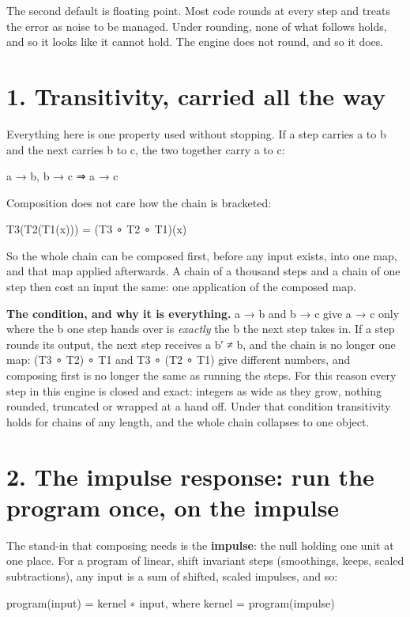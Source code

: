 The second default is floating point. Most code rounds at every step and treats the error as noise to be managed. Under rounding, none of what follows holds, and so it looks like it cannot hold. The engine does not round, and so it does.

\section{\texorpdfstring{1. Transitivity, carried all the way}{1. Transitivity, carried all the way}}

Everything here is one property used without stopping. If a step carries a to b and the next carries b to c, the two together carry a to c:

a → b,  b → c   ⇒   a → c

Composition does not care how the chain is bracketed:

T3(T2(T1(x))) = (T3 ∘ T2 ∘ T1)(x)

So the whole chain can be composed first, before any input exists, into one map, and that map applied afterwards. A chain of a thousand steps and a chain of one step then cost an input the same: one application of the composed map.

\textbf{The condition, and why it is everything.} a → b and b → c give a → c only where the b one step hands over is \emph{exactly} the b the next step takes in. If a step rounds its output, the next step receives a b′ ≠ b, and the chain is no longer one map: (T3 ∘ T2) ∘ T1 and T3 ∘ (T2 ∘ T1) give different numbers, and composing first is no longer the same as running the steps. For this reason every step in this engine is closed and exact: integers as wide as they grow, nothing rounded, truncated or wrapped at a hand off. Under that condition transitivity holds for chains of any length, and the whole chain collapses to one object.

\section{\texorpdfstring{2. The impulse response: run the program once, on the impulse}{2. The impulse response: run the program once, on the impulse}}

The stand-in that composing needs is the \textbf{impulse}: the null holding one unit at one place. For a program of linear, shift invariant steps (smoothings, keeps, scaled subtractions), any input is a sum of shifted, scaled impulses, and so:

program(input) = kernel ∗ input,    where  kernel = program(impulse)

